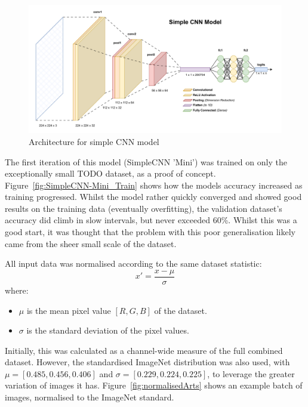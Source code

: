                 \begin{figure}[htbp]
                    \centering
                    \includegraphics[width=\linewidth]{images/BabyOuroboros.pdf}
                    \caption{Architecture for simple CNN model}
                    \label{fig:BabyOuroboros}
                \end{figure}
    
                The first iteration of this model (SimpleCNN 'Mini') was trained on only the exceptionally small TODO dataset, as a proof of concept. Figure~\ref{fig:SimpleCNN-Mini_Train} shows how the models accuracy increased as training progressed. Whilst the model rather quickly converged and showed good results on the training data (eventually overfitting), the validation dataset's accuracy did climb in slow intervals, but never exceeded 60\%. Whilst this was a good start, it was thought that the problem with this poor generalisation likely came from the sheer small scale of the dataset.
    
                All input data was normalised according to the same dataset statistic:
                    \[
                    x' = \frac{x - \mu}{\sigma}
                    \]
                where:
                    \begin{itemize}
                        \item \( \mu \) is the mean pixel value \([R,G,B]\) of the dataset.
                        \item \( \sigma \) is the standard deviation of the pixel values.
                    \end{itemize}
    
                Initially, this was calculated as a channel-wide measure of the full combined dataset. However, the standardised ImageNet distribution was also used, with \( \mu = [0.485, 0.456, 0.406] \) and \( \sigma = [0.229, 0.224, 0.225] \), to leverage the greater variation of images it has. Figure~\ref{fig:normalisedArts} shows an example batch of images, normalised to the ImageNet standard.
        
